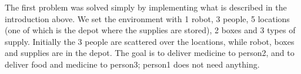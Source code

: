 The first problem was solved simply by implementing what is described in the introduction above.
We set the environment with 1 robot, 3 people, 5 locations (one of which is the depot where the supplies are stored), 2 boxes and 3 types of supply.
Initially the 3 people are scattered over the locations, while robot, boxes and supplies are in the depot.
The goal is to deliver medicine to person2, and to deliver food and medicine to person3; person1 does not need anything.
